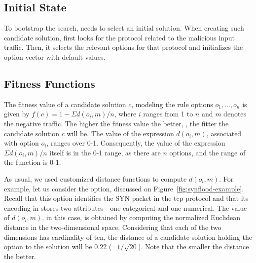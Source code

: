 \documentclass[conference]{IEEEtran}
\begin{document}
\subsection{Initial State}

To bootstrap the search, \tname{} needs to select an initial
solution. When creating such candidate solution, \tname{} first looks
for the protocol related to the malicious input traffic. Then, it
selects the relevant options for that protocol and initializes the
option vector with default values. 


\subsection{Fitness Functions}

The fitness value of a candidate solution $c$, modeling the rule
options $o_1, \dots, o_n$ is given by $f(c)=1-\Sigma{d(o_i,m)}/n$,
where $i$ ranges from 1 to $n$ and $m$ denotes the negative
traffic. The higher the fitness value the better, \ie{}, the fitter
the candidate solution $c$ will be.  The value of the expression
$d(o_i,m)$, associated with option $o_i$, ranges over
0-1. Consequently, the value of the expression $\Sigma{d(o_i,m)}/n$
itself is in the 0-1 range, as there are $n$ options, and the range of
the function is 0-1.

As usual, we used customized distance functions to compute $d(o_i,
m)$. For example, let us consider the  option, discussed
on Figure~\ref{fig:synflood-example}. Recall that this option
identifies the SYN packet in the tcp protocol and that its encoding in
\tname{} stores two attributes---one categorical and one
numerical. The value of $d(o_i, m)$, in this case, is obtained by
computing the normalized Euclidean distance in the two-dimensional
space. Considering that each of the two dimensions has cardinality of
ten, the distance of a candidate solution holding the option
 to the solution will be 0.22
(=$1/\sqrt{20}$). Note that the smaller the distance the better.
\end{document}
